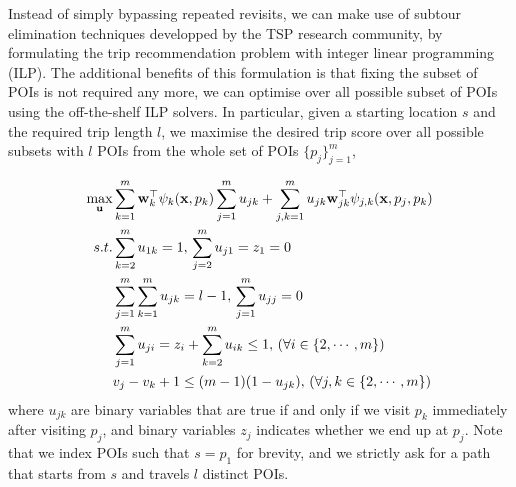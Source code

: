

Instead of simply bypassing repeated revisits, 
we can make use of subtour elimination techniques developped by the TSP research community,
by formulating the trip recommendation problem with integer linear programming (ILP).
The additional benefits of this formulation is that fixing the subset of POIs is not required any more,
we can optimise over all possible subset of POIs using the off-the-shelf ILP solvers.
In particular, given a starting location $s$ and the required trip length $l$,
we maximise the desired trip score over all possible subsets with $l$ POIs from the whole set of POIs $\{p_j\}_{j=1}^m$, \ie

\begin{align*}
\max_{\bu} & \sum_{k=1}^m \w_k^\top \psi_k(\x, p_k) \sum_{j=1}^m u_{jk} +
             \sum_{j,k=1}^m u_{jk} \w_{jk}^\top \psi_{j, k}(\x, p_j, p_k) \\
s.t. 
& \sum_{k=2}^m u_{1k} = 1, \, \sum_{j=2}^m u_{j1} = z_1=0  \\                %
& \sum_{j=1}^m \sum_{k=1}^m u_{jk} = l-1, \, \sum_{j=1}^m u_{jj}=0  \\      %
& \sum_{j=1}^m u_{ji} = z_i + \sum_{k=2}^m u_{ik} \le 1, \, (\forall i \in \{2,\cdots,m\})  \\ %
& v_j - v_k + 1 \le (m-1) (1-u_{jk}), \, (\forall j,k \in \{2,\cdots,m\})                 %
\end{align*}
where $u_{jk}$ are binary variables that are true if and only if
we visit $p_k$ immediately after visiting $p_j$,
and binary variables $z_j$ indicates whether we end up at $p_j$.
Note that we index POIs such that $s = p_1$ for brevity,
and we strictly ask for a path that starts from $s$ and travels $l$ distinct POIs.
